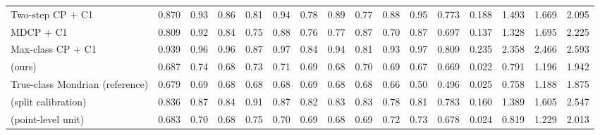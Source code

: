 \begin{table}[!htbp]
{\begin{tabular}{lccccccccccccccc}
Two-step CP + C1 & 0.870 & 0.93 & 0.86 & 0.81 & 0.94 & 0.78 & 0.89 & 0.77 & 0.88 & 0.95 & 0.773 & 0.188 & 1.493 & 1.669 & 2.095 \\
MDCP + C1 & 0.809 & 0.92 & 0.84 & 0.75 & 0.88 & 0.76 & 0.77 & 0.87 & 0.70 & 0.87 & 0.697 & 0.137 & 1.328 & 1.695 & 2.225 \\
Max-class CP + C1 & 0.939 & 0.96 & 0.96 & 0.87 & 0.97 & 0.84 & 0.94 & 0.81 & 0.93 & 0.97 & 0.809 & 0.235 & 2.358 & 2.466 & 2.593 \\
\gamut{} (ours) & 0.687 & 0.74 & 0.68 & 0.73 & 0.71 & 0.69 & 0.68 & 0.70 & 0.69 & 0.67 & 0.669 & 0.022 & 0.791 & 1.196 & 1.942 \\
True-class Mondrian (reference) & 0.679 & 0.69 & 0.68 & 0.68 & 0.68 & 0.69 & 0.68 & 0.68 & 0.66 & 0.50 & 0.496 & 0.025 & 0.758 & 1.188 & 1.875 \\
\gamut{} (split calibration) & 0.836 & 0.87 & 0.84 & 0.91 & 0.87 & 0.82 & 0.83 & 0.83 & 0.78 & 0.81 & 0.783 & 0.160 & 1.389 & 1.605 & 2.547 \\
\gamut{} (point-level unit) & 0.683 & 0.70 & 0.68 & 0.75 & 0.70 & 0.69 & 0.68 & 0.69 & 0.72 & 0.73 & 0.678 & 0.024 & 0.819 & 1.229 & 2.013 \\
\bottomrule
\end{tabular}}
\end{table}

